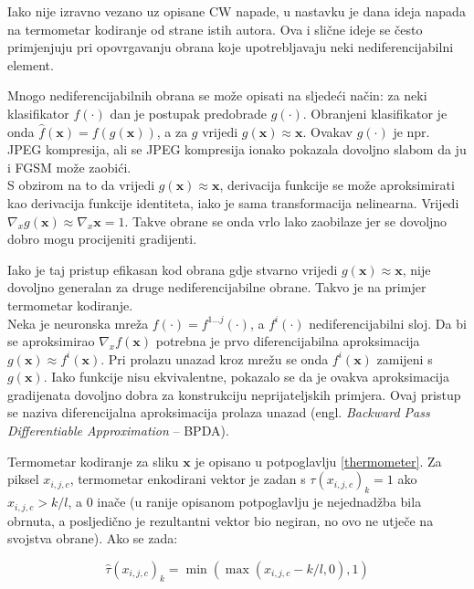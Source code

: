 \documentclass[utf8, diplomski]{fer}
\begin{document}
Iako nije izravno vezano uz opisane CW napade, u nastavku je dana ideja napada na termometar kodiranje od strane istih autora\citep{obfuscated}. Ova i slične ideje se često primjenjuju pri opovrgavanju obrana koje upotrebljavaju neki nediferencijabilni element. \par
Mnogo nediferencijabilnih obrana se može opisati na sljedeći način: za neki klasifikator $f(\cdot)$ dan je postupak predobrade $g(\cdot)$. Obranjeni klasifikator je onda $\hat{f}(\boldsymbol{x}) = f(g(\boldsymbol{x}))$, a za $g$ vrijedi $g(\boldsymbol{x}) \approx \boldsymbol{x}$. Ovakav $g(\cdot)$ je npr. JPEG kompresija, ali se JPEG kompresija ionako pokazala dovoljno slabom da ju i FGSM može zaobići. \\
S obzirom na to da vrijedi $g(\boldsymbol{x}) \approx \boldsymbol{x}$, derivacija funkcije se može aproksimirati kao derivacija funkcije identiteta, iako je sama transformacija nelinearna. Vrijedi $\nabla_{x}g(\boldsymbol{x}) \approx \nabla_{x} \boldsymbol{x} = 1$. Takve obrane se onda vrlo lako zaobilaze jer se dovoljno dobro mogu procijeniti gradijenti.
\par
Iako je taj pristup efikasan kod obrana gdje stvarno vrijedi $g(\boldsymbol{x}) \approx \boldsymbol{x}$, nije dovoljno generalan za druge nediferencijabilne obrane. Takvo je na primjer termometar kodiranje. \\
Neka je neuronska mreža $f(\cdot) = f^{1...j}(\cdot)$, a $f^{i}(\cdot)$ nediferencijabilni sloj. Da bi se aproksimirao $\nabla_{x}f(\boldsymbol{x})$ potrebna je prvo diferencijabilna aproksimacija $g(\boldsymbol{x}) \approx f^{i}(\boldsymbol{x})$. Pri prolazu unazad kroz mrežu se onda $f^{i}(\boldsymbol{x})$ zamijeni s $g(\boldsymbol{x})$. Iako funkcije nisu ekvivalentne, pokazalo se da je ovakva aproksimacija gradijenata dovoljno dobra za konstrukciju neprijateljskih primjera. Ovaj pristup se naziva diferencijalna aproksimacija prolaza unazad (engl. \textit{Backward Pass Differentiable Approximation} -- BPDA).
\par
Termometar kodiranje za sliku $\boldsymbol{x}$ je opisano u potpoglavlju \ref{thermometer}. Za piksel $x_{i,j,c}$, termometar enkodirani vektor je zadan s $\tau(x_{i, j, c})_{k} = 1$ ako $x_{i,j,c} > k/l$, a $0$ inače (u ranije opisanom potpoglavlju je nejednadžba bila obrnuta, a posljedično je rezultantni vektor bio negiran, no ovo ne utječe na svojstva obrane). Ako se zada:

\begin{equation}
	\hat{\tau} (x_{i, j, c})_{k} = \min(\max(x_{i,j,c} - k/l, 0), 1)
\end{equation}
\end{document}

